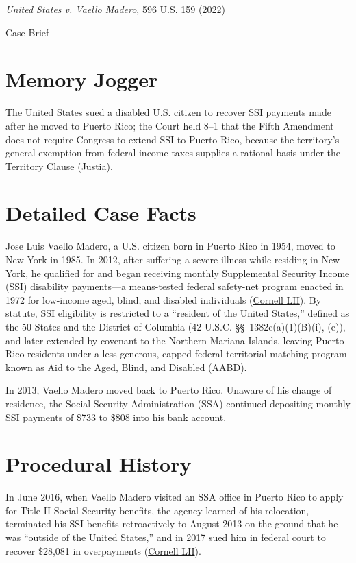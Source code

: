 \documentclass[12pt]{article}
\begin{document}
\begin{center}
{\LARGE \textit{United States v. Vaello Madero}, 596 U.S. 159 (2022)\par}
\vspace{0.8em}
{\large Case Brief\par}
\end{center}
\vspace{1em}

\section{Memory Jogger}
The United States sued a disabled U.S. citizen to recover SSI payments made after he moved to Puerto Rico; the Court held 8--1 that the Fifth Amendment does not require Congress to extend SSI to Puerto Rico, because the territory's general exemption from federal income taxes supplies a rational basis under the Territory Clause (\href{https://supreme.justia.com/cases/federal/us/596/20-303/}{Justia}).

\section{Detailed Case Facts}
Jose Luis Vaello Madero, a U.S. citizen born in Puerto Rico in 1954, moved to New York in 1985. In 2012, after suffering a severe illness while residing in New York, he qualified for and began receiving monthly Supplemental Security Income (SSI) disability payments---a means-tested federal safety-net program enacted in 1972 for low-income aged, blind, and disabled individuals (\href{https://www.law.cornell.edu/supremecourt/text/20-303}{Cornell LII}). By statute, SSI eligibility is restricted to a ``resident of the United States,'' defined as the 50 States and the District of Columbia (42 U.S.C. \S\S~1382c(a)(1)(B)(i), (e)), and later extended by covenant to the Northern Mariana Islands, leaving Puerto Rico residents under a less generous, capped federal-territorial matching program known as Aid to the Aged, Blind, and Disabled (AABD).

In 2013, Vaello Madero moved back to Puerto Rico. Unaware of his change of residence, the Social Security Administration (SSA) continued depositing monthly SSI payments of \$733 to \$808 into his bank account.

\section{Procedural History}
In June 2016, when Vaello Madero visited an SSA office in Puerto Rico to apply for Title II Social Security benefits, the agency learned of his relocation, terminated his SSI benefits retroactively to August 2013 on the ground that he was ``outside of the United States,'' and in 2017 sued him in federal court to recover \$28,081 in overpayments (\href{https://www.law.cornell.edu/supremecourt/text/20-303}{Cornell LII}).
\end{document}

